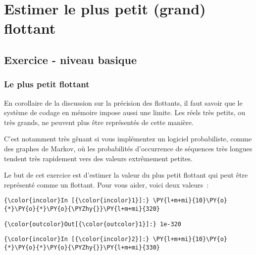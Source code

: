     
    
    
    

    

    \hypertarget{estimer-le-plus-petit-grand-flottant}{%
\section{Estimer le plus petit (grand)
flottant}\label{estimer-le-plus-petit-grand-flottant}}

    \hypertarget{exercice---niveau-basique}{%
\subsection{Exercice - niveau basique}\label{exercice---niveau-basique}}

    \hypertarget{le-plus-petit-flottant}{%
\subsubsection{Le plus petit flottant}\label{le-plus-petit-flottant}}

    En corollaire de la discussion sur la précision des flottants, il faut
savoir que le système de codage en mémoire impose aussi une limite. Les
réels très petits, ou très grands, ne peuvent plus être représentés de
cette manière.

C'est notamment très gênant si vous implémentez un logiciel
probabiliste, comme des graphes de Markov, où les probabilités
d'occurrence de séquences très longues tendent très rapidement vers des
valeurs extrêmement petites.

    Le but de cet exercice est d'estimer la valeur du plus petit flottant
qui peut être représenté comme un flottant. Pour vous aider, voici deux
valeurs~:

    \begin{Verbatim}[commandchars=\\\{\},frame=single,framerule=0.3mm,rulecolor=\color{cellframecolor}]
{\color{incolor}In [{\color{incolor}1}]:} \PY{l+m+mi}{10}\PY{o}{*}\PY{o}{*}\PY{o}{\PYZhy{}}\PY{l+m+mi}{320}
\end{Verbatim}


\begin{Verbatim}[commandchars=\\\{\},frame=single,framerule=0.3mm,rulecolor=\color{cellframecolor}]
{\color{outcolor}Out[{\color{outcolor}1}]:} 1e-320
\end{Verbatim}
            
    \begin{Verbatim}[commandchars=\\\{\},frame=single,framerule=0.3mm,rulecolor=\color{cellframecolor}]
{\color{incolor}In [{\color{incolor}2}]:} \PY{l+m+mi}{10}\PY{o}{*}\PY{o}{*}\PY{o}{\PYZhy{}}\PY{l+m+mi}{330}
\end{Verbatim}


